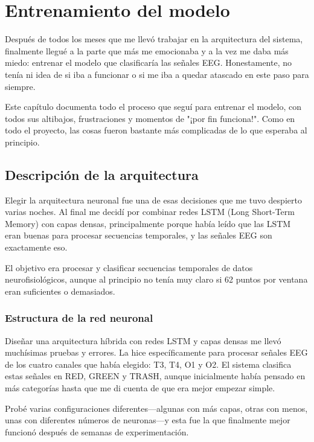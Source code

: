\chapter{Entrenamiento del modelo}\label{ch:model_training}

Después de todos los meses que me llevó trabajar en la arquitectura del sistema, finalmente llegué a la parte que más me emocionaba y a la vez me daba más miedo: entrenar el modelo que clasificaría las señales EEG. Honestamente, no tenía ni idea de si iba a funcionar o si me iba a quedar atascado en este paso para siempre.

Este capítulo documenta todo el proceso que seguí para entrenar el modelo, con todos sus altibajos, frustraciones y momentos de "¡por fin funciona!". Como en todo el proyecto, las cosas fueron bastante más complicadas de lo que esperaba al principio.

\section{Descripción de la arquitectura}

Elegir la arquitectura neuronal fue una de esas decisiones que me tuvo despierto varias noches. Al final me decidí por combinar redes LSTM (Long Short-Term Memory) con capas densas, principalmente porque había leído que las LSTM eran buenas para procesar secuencias temporales, y las señales EEG son exactamente eso. 

El objetivo era procesar y clasificar secuencias temporales de datos neurofisiológicos, aunque al principio no tenía muy claro si 62 puntos por ventana eran suficientes o demasiados.

\subsection{Estructura de la red neuronal}

Diseñar una arquitectura híbrida con redes LSTM y capas densas me llevó muchísimas pruebas y errores. La hice específicamente para procesar señales EEG de los cuatro canales que había elegido: T3, T4, O1 y O2. El sistema clasifica estas señales en RED, GREEN y TRASH, aunque inicialmente había pensado en más categorías hasta que me di cuenta de que era mejor empezar simple.

Probé varias configuraciones diferentes—algunas con más capas, otras con menos, unas con diferentes números de neuronas—y esta fue la que finalmente mejor funcionó después de semanas de experimentación.

